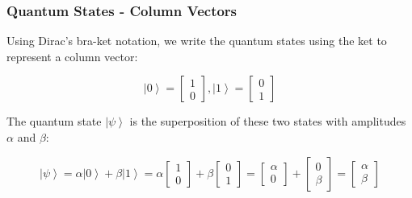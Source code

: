 \documentclass{beamer}
\newcommand{\ket}[1]{\ensuremath{\left|#1\right\rangle}}
\begin{document}
\begin{frame}\frametitle{Quantum States - Column Vectors}

Using Dirac's bra-ket notation, we write the quantum states using the ket to represent a column vector:

\[\ket{0} = \begin{bmatrix} 1 \\ 0 \end{bmatrix}, \ket{1} = \begin{bmatrix} 0 \\ 1 \end{bmatrix} \]

The quantum state $\ket{\psi}$ is the superposition of these two states with amplitudes $\alpha$ and $\beta$:

\[\ket{\psi} = \alpha\ket{0}+\beta\ket{1} = \alpha \begin{bmatrix} 1 \\ 0 \end{bmatrix} + \beta \begin{bmatrix} 0 \\ 1 \end{bmatrix}= \begin{bmatrix} \alpha \\ 0 \end{bmatrix} + \begin{bmatrix} 0 \\ \beta \end{bmatrix} = \begin{bmatrix} \alpha \\ \beta \end{bmatrix}\]

\end{frame}
\end{document}

